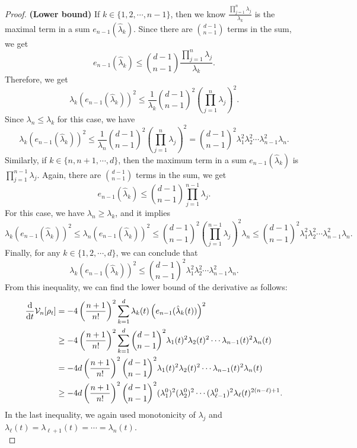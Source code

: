 \documentclass[11pt,reqno]{amsart}
\numberwithin{figure}{section}
\def\d {{\partial}}
\def\d{\mathrm{d}}
\newcommand{\dm}{d}
\renewcommand{\d}{  {\textup{d}} }
\begin{document}
\begin{proof}
\noindent\textbf{(Lower bound)} If $k\in\{1, 2, \cdots, n-1\}$, then we know $\frac{\prod_{j=1}^{n}\lambda_j}{\lambda_k}$ is the maximal term in a sum $e_{n-1}(\hat{\lambda}_k)$. Since there are ${\dm-1\choose n-1}$ terms in the sum, we get
\[
e_{n-1}(\hat{\lambda}_k)\leq {\dm-1\choose n-1}\frac{\prod_{j=1}^{n}\lambda_j}{\lambda_k}.
\]
Therefore, we get
\[
\lambda_k\left(e_{n-1}(\hat{\lambda}_k)\right)^2\leq\frac{1}{\lambda_k}{\dm-1\choose n-1}^2\left(\prod_{j=1}^{n}\lambda_j\right)^2.
\]
Since $\lambda_n\leq \lambda_k$ for this case, we have
\[
\lambda_k\left(e_{n-1}(\hat{\lambda}_k)\right)^2\leq\frac{1}{\lambda_n}{\dm-1\choose n-1}^2\left(\prod_{j=1}^{n}\lambda_j\right)^2={\dm-1\choose n-1}^2\lambda_1^2\lambda_2^2\cdots\lambda_{n-1}^2\lambda_n.
\]
Similarly, if $k\in \{n,n+1, \cdots, \dm\}$, then the maximum term in a sum $e_{n-1}(\hat{\lambda}_k)$ is $\prod_{j=1}^{n-1}\lambda_j$. Again, there are ${\dm-1\choose n-1}$ terms in the sum, we get
\[
e_{n-1}(\hat{\lambda}_k)\leq {\dm-1\choose n-1}\prod_{j=1}^{n-1}\lambda_j.
\]
For this case, we have $\lambda_n\geq \lambda_k$, and it implies
\[
\lambda_k\left(e_{n-1}(\hat{\lambda}_k)\right)^2\leq \lambda_n\left(e_{n-1}(\hat{\lambda}_k)\right)^2\leq {\dm-1\choose n-1}^2\left(\prod_{j=1}^{n-1}\lambda_j\right)^2 \lambda_n\leq {\dm-1\choose n-1}^2\lambda_1^2\lambda_2^2\cdots\lambda_{n-1}^2\lambda_n.
\]
Finally, for any $k\in\{1, 2, \cdots, \dm\}$, we can conclude that
\[
\lambda_k\left(e_{n-1}(\hat{\lambda}_k)\right)^2\leq {\dm-1\choose n-1}^2\lambda_1^2\lambda_2^2\cdots\lambda_{n-1}^2\lambda_n.
\]
From this inequality, we can find the lower bound of the derivative as follows:
\begin{align*}
\frac{\d}{\d t}\mathcal{V}_n[\rho_t]
&=-4\left(\frac{n+1}{n!}\right)^2\sum_{k=1}^d\lambda_k(t)\left(e_{n-1}(\hat{\lambda}_k(t))\right)^2\\
&\geq-4\left(\frac{n+1}{n!}\right)^2\sum_{k=1}^d{\dm-1\choose n-1}^2\lambda_1(t)^2\lambda_2(t)^2\cdots\lambda_{n-1}(t)^2\lambda_n(t)\\
&=-4\dm\left(\frac{n+1}{n!}\right)^2{\dm-1\choose n-1}^2\lambda_1(t)^2\lambda_2(t)^2\cdots\lambda_{n-1}(t)^2\lambda_n(t)\\
&\geq-4\dm\left(\frac{n+1}{n!}\right)^2{\dm-1\choose n-1}^2(\lambda_1^0)^2(\lambda_2^0)^2\cdots(\lambda_{\ell-1}^0)^2\lambda_{\ell}(t)^{2(n-\ell)+1}.
\end{align*}
In the last inequality, we again used monotonicity of $\lambda_j$ and $\lambda_{\ell}(t)=\lambda_{\ell+1}(t)=\cdots=\lambda_n(t)$.\\


\end{proof}
\end{document}
